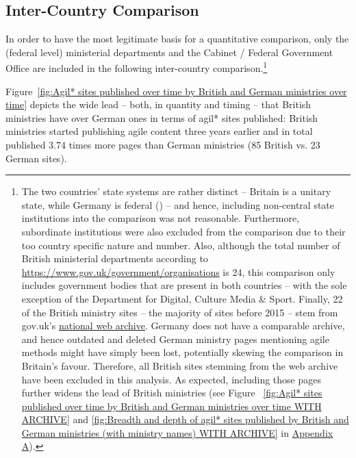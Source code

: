 \subsection{Inter-Country Comparison}\label{Inter-Country Comparison} 
\begin{wrapfigure}[10]{r}{0.5\textwidth}
	\centering
	 \texttt{[image: \{"Code/3\_Data\_Analysis/visualisations/british\_vs\_German\_federal\_ministries\_over\_time\_without\_archive"]}.pdf}
	 \setlength{\belowcaptionskip}{-30pt}
	 \caption[Agil* sites published by British and German ministries over time]{Agil* sites published by British and German ministries over time}
	 \label{fig:Agil* sites published over time by British and German ministries over time}
\end{wrapfigure}
In order to have the most legitimate basis for a quantitative comparison, only the (federal level) ministerial departments and the Cabinet / Federal Government Office are included in the following inter-country comparison.\footnote{The two countries' state systems are rather distinct – Britain is a unitary state, while Germany is federal (\cite{Elazar1997}) – and hence, including non-central state institutions into the comparison was not reasonable. Furthermore, subordinate institutions were also excluded from the comparison due to their too country specific nature and number. Also, although the total number of British ministerial departments according to \url{https://www.gov.uk/government/organisations} is 24, this comparison only includes government bodies that are present in both countries – with the sole exception of the Department for Digital, Culture Media \& Sport. Finally, 22 of the British ministry sites – the majority of sites before 2015 – stem from gov.uk's \href{https://webarchive.nationalarchives.gov.uk/search/}{national web archive}. Germany does not have a comparable archive, and hence outdated and deleted German ministry pages mentioning agile methods might have simply been lost, potentially skewing the comparison in Britain's favour. Therefore, all British sites stemming from the web archive have been excluded in this analysis. As expected, including those pages further widens the lead of British ministries (see Figure
~\ref{fig:Agil* sites published over time by British and German ministries over time WITH ARCHIVE} and \ref{fig:Breadth and depth of agil* sites published by British and German ministries (with ministry names) WITH ARCHIVE} in \hyperref[Appendix A]{Appendix A}).} 

Figure~\ref{fig:Agil* sites published over time by British and German ministries over time} depicts the wide lead – both, in quantity and timing – that British ministries have over German ones in terms of agil* sites published: British ministries started publishing agile content three years earlier and in total published 3.74 times more pages than German ministries (85 British vs. 23 German sites).

